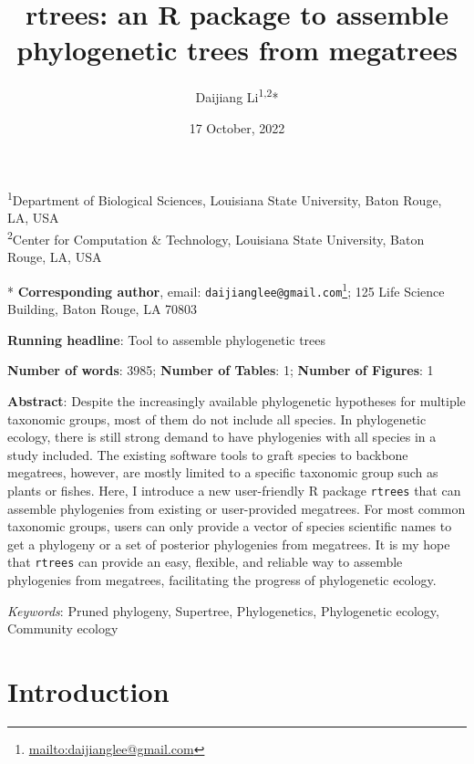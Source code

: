 \documentclass[
  12pt,
]{article}
\title{rtrees: an R package to assemble phylogenetic trees from megatrees}
\author{Daijiang Li\textsuperscript{1,2}*}
\date{17 October, 2022}
\DeclareRobustCommand{\href}[2]{#2\footnote{\url{#1}}}
\begin{document}
\maketitle

\renewcommand{\figurename}{{\textbf{Figure}}}
\renewcommand{\tablename}{{\textbf{Table}}}

\footnotesize

\textsuperscript{1}Department of Biological Sciences, Louisiana State University, Baton Rouge, LA, USA\\
\textsuperscript{2}Center for Computation \& Technology, Louisiana State University, Baton Rouge, LA, USA

* \textbf{Corresponding author}, email: \href{mailto:daijianglee@gmail.com}{\nolinkurl{daijianglee@gmail.com}}; 125 Life Science Building, Baton Rouge, LA 70803

\normalsize

\textbf{Running headline}: Tool to assemble phylogenetic trees

\textbf{Number of words}: 3985; \textbf{Number of Tables}: 1; \textbf{Number of Figures}: 1

\textbf{Abstract}: Despite the increasingly available phylogenetic hypotheses for multiple taxonomic groups, most of them do not include all species. In phylogenetic ecology, there is still strong demand to have phylogenies with all species in a study included. The existing software tools to graft species to backbone megatrees, however, are mostly limited to a specific taxonomic group such as plants or fishes. Here, I introduce a new user-friendly R package \texttt{rtrees} that can assemble phylogenies from existing or user-provided megatrees. For most common taxonomic groups, users can only provide a vector of species scientific names to get a phylogeny or a set of posterior phylogenies from megatrees. It is my hope that \texttt{rtrees} can provide an easy, flexible, and reliable way to assemble phylogenies from megatrees, facilitating the progress of phylogenetic ecology.

\emph{Keywords}: Pruned phylogeny, Supertree, Phylogenetics, Phylogenetic ecology, Community ecology

\clearpage

\hypertarget{introduction}{%
\section{Introduction}\label{introduction}}
\end{document}
